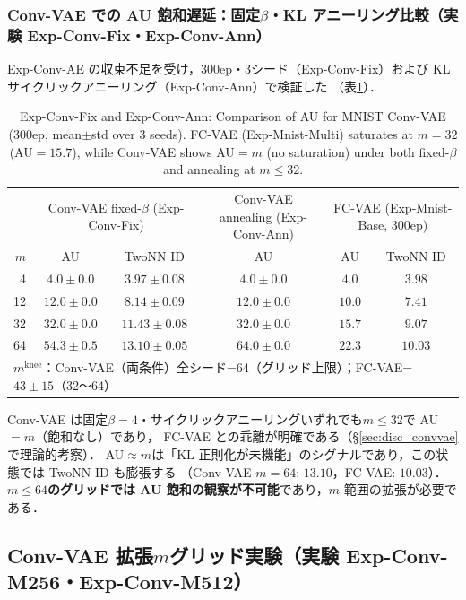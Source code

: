 \documentclass[11pt,a4paper]{jsarticle}
\newcommand{\mknee}{m^{\mathrm{knee}}}
\begin{document}
\subsubsection{Conv-VAE での AU 飽和遅延：固定$\beta$・KL アニーリング比較（実験 Exp-Conv-Fix・Exp-Conv-Ann）}
\label{sec:exp_conv_300ep}

Exp-Conv-AE の収束不足を受け，300ep・3シード（Exp-Conv-Fix）および KL サイクリックアニーリング（Exp-Conv-Ann）で検証した
（表\ref{tab:eh_conv_vae}）．

\begin{table}[H]
\centering
\caption{Exp-Conv-Fix and Exp-Conv-Ann: Comparison of AU for MNIST Conv-VAE (300ep, mean$\pm$std over 3 seeds). FC-VAE (Exp-Mnist-Multi) saturates at $m=32$ (AU$=15.7$), while Conv-VAE shows AU$=m$ (no saturation) under both fixed-$\beta$ and annealing at $m \leq 32$.}
\label{tab:eh_conv_vae}
\small
\begin{tabular}{r ccc cc}
\toprule
 & \multicolumn{2}{c}{Conv-VAE fixed-$\beta$ (Exp-Conv-Fix)} & \multicolumn{1}{c}{Conv-VAE annealing (Exp-Conv-Ann)} & \multicolumn{2}{c}{FC-VAE (Exp-Mnist-Base, 300ep)} \\
$m$ & AU & TwoNN ID & AU & AU & TwoNN ID \\
\midrule
 4 & $4.0\pm0.0$ & $3.97\pm0.08$ & $4.0\pm0.0$ & $4.0$ & $3.98$ \\
12 & $12.0\pm0.0$ & $8.14\pm0.09$ & $12.0\pm0.0$ & $10.0$ & $7.41$ \\
32 & $32.0\pm0.0$ & $11.43\pm0.08$ & $32.0\pm0.0$ & $15.7$ & $9.07$ \\
64 & $54.3\pm0.5$ & $13.10\pm0.05$ & $64.0\pm0.0$ & $22.3$ & $10.03$ \\
\midrule
\multicolumn{6}{l}{$\mknee$：Conv-VAE（両条件）全シード=64（グリッド上限）；FC-VAE=$43\pm15$（32〜64）} \\
\bottomrule
\end{tabular}
\end{table}

Conv-VAE は固定$\beta=4$・サイクリックアニーリングいずれでも$m \leq 32$で AU$=m$（飽和なし）であり，
FC-VAE との乖離が明確である（§\ref{sec:disc_convvae}で理論的考察）．
AU$\approx m$は「KL 正則化が未機能」のシグナルであり，この状態では TwoNN ID も膨張する
（Conv-VAE $m=64$: $13.10$，FC-VAE: $10.03$）．
\textbf{$m \leq 64$のグリッドでは AU 飽和の観察が不可能}であり，$m$ 範囲の拡張が必要である．

\subsection{Conv-VAE 拡張$m$グリッド実験（実験 Exp-Conv-M256・Exp-Conv-M512）}\label{sec:exp_en}
\end{document}
